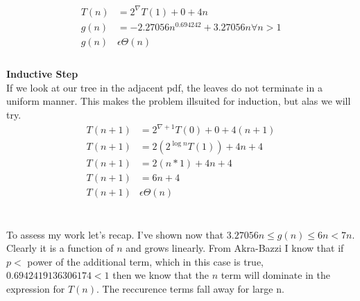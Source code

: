 \documentclass[paper=a4,fontsize=11pt]{article}
\begin{document}
\begin{enumerate}
\begin{enumerate}
\begin{align*}
T(n) &=2^{\nabla}T(1) + 0 + 4n\\
g(n) &= -2.27056n^{0.694242}+3.27056n\forall{n>1}\\
g(n) &\epsilon \Theta(n)\\
\end{align*}\\
\textbf{Inductive Step}\\
If we look at our tree in the adjacent pdf, the leaves do not terminate in a uniform manner. This makes the problem illsuited for induction, but alas we will try.\\
\begin{align*}
T(n + 1) &=2^{\nabla + 1}T(0) + 0 + 4(n + 1)\\
T(n + 1) &=2(2^{\log{n}}T(1)) + 4n + 4\\
T(n + 1) &=2(n*1) + 4n + 4\\
T(n + 1) &=6n + 4\\
T(n+1) &\epsilon \Theta(n)\
\end{align*}\\
\\To assess my work let's recap. I've shown now that $3.27056n\leq g(n)\leq 6n<7n$. Clearly it is a function of $n$ and grows linearly. From Akra-Bazzi I know that if $p < $ power of the additional term, which in this case is true, $0.6942419136306174 < 1$ then we know that the $n$ term will dominate in the expression for $T(n)$. The reccurence terms fall away for large n. 
\end{enumerate}
\end{enumerate}
\end{document}
